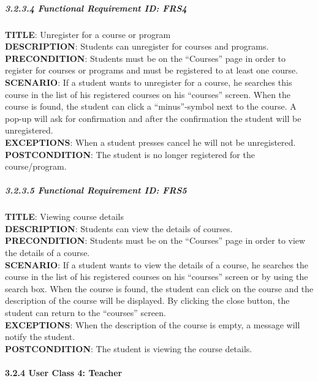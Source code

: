\documentclass[12pt]{article}
\begin{document}
\subparagraph{3.2.3.4 Functional Requirement \textbf{ID}:
FRS4\\}\label{functional-requirement-id-frs4}

\textbf{TITLE}: Unregister for a course or
program\\\textbf{DESCRIPTION}: Students can unregister for courses and
programs.\\\textbf{PRECONDITION}: Students must be on the ``Courses''
page in order to register for courses or programs and must be registered
to at least one course.\\\textbf{SCENARIO}: If a student wants to
unregister for a course, he searches this course in the list of his
registered courses on his ``courses'' screen. When the course is found,
the student can click a ``minus''-symbol next to the course. A pop-up
will ask for confirmation and after the confirmation the student will be
unregistered.\\\textbf{EXCEPTIONS}: When a student presses cancel he
will not be unregistered.\\\textbf{POSTCONDITION}: The student is no
longer registered for the course/program.

\subparagraph{3.2.3.5 Functional Requirement \textbf{ID}:
FRS5\\}\label{functional-requirement-id-frs5}

\textbf{TITLE}: Viewing course details\\\textbf{DESCRIPTION}: Students
can view the details of courses.\\\textbf{PRECONDITION}: Students must
be on the ``Courses'' page in order to view the details of a
course.\\\textbf{SCENARIO}: If a student wants to view the details of a
course, he searches the course in the list of his registered courses on
his ``courses'' screen or by using the search box. When the course is
found, the student can click on the course and the description of the
course will be displayed. By clicking the close button, the student can
return to the ``courses'' screen.\\\textbf{EXCEPTIONS}: When the
description of the course is empty, a message will notify the
student.\\\textbf{POSTCONDITION}: The student is viewing the course
details.

\paragraph{3.2.4 User Class 4: Teacher}\label{user-class-4-teacher}
\end{document}
